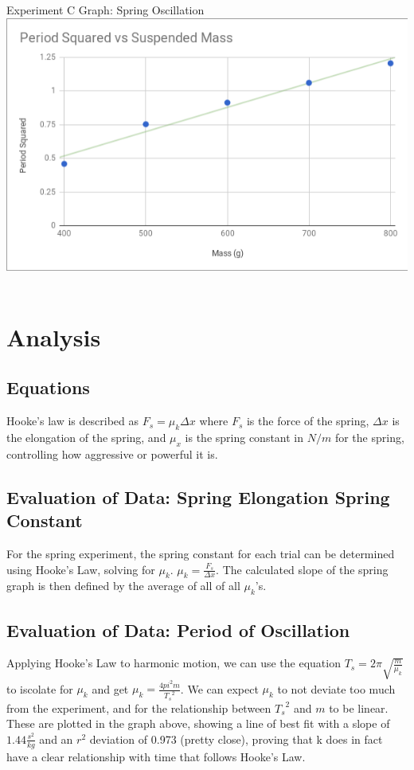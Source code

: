 \documentclass[12pt]{article}
\begin{document}
        {\large Experiment C Graph: Spring Oscillation} \\
        \includegraphics[width=\textwidth]{Graph1.png} \\ \\
    \section{Analysis}
        \subsection{Equations}
            Hooke's law is described as $F_s = \mu_k \Delta x$ where $F_s$ is
            the force of the spring, $\Delta x$ is the elongation of the
            spring, and $\mu_x$ is the spring constant in $N/m$ for the spring,
            controlling how aggressive or powerful it is.
        \subsection{Evaluation of Data: Spring Elongation Spring Constant}
            For the spring experiment, the spring constant for each trial can be
            determined using Hooke's Law, solving for $\mu_k$.
            $\mu_k = \frac{F_s}{\Delta x}$. The calculated slope of the spring
            graph is then defined by the average of all of all $\mu_k$'s.
        \subsection{Evaluation of Data: Period of Oscillation}
            Applying Hooke's Law to harmonic motion, we can use the equation
            $T_s = 2\pi \sqrt{ \frac{m}{\mu_k}}$ to iscolate for $\mu_k$ and 
            get $\mu_k = \frac{4pi^2m}{{T_s}^2}$. We can expect $\mu_k$ to not
            deviate too much from the experiment, and for the relationship between
            ${T_s}^2$ and $m$ to be linear. These are plotted in the graph above,
            showing a line of best fit with a slope of $1.44 \frac{s^2}{kg}$ and
            an $r^2$ deviation of 0.973 (pretty close), proving that k does in fact
            have a clear relationship with time that follows Hooke's Law.
\end{document}

